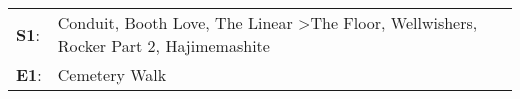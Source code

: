 \begin{supertabular}{p{0.03\textwidth}p{0.92\textwidth}}
 \textbf{S1}:  &  Conduit\textsuperscript{}, \enspace Booth Love\textsuperscript{}, \enspace The Linear\textsuperscript{} \textgreater \enspace The Floor\textsuperscript{}, \enspace Wellwishers\textsuperscript{}, \enspace Rocker Part 2\textsuperscript{}, \enspace Hajimemashite\textsuperscript{}  \enspace  \\
 \textbf{E1}:  &                                                                                                                                                                                                                                                        Cemetery Walk\textsuperscript{}  \enspace  \\
\end{supertabular}
